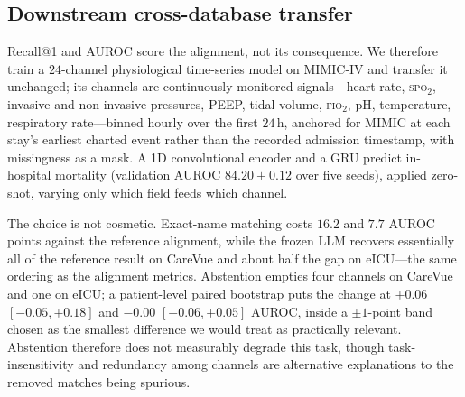 \subsection{Downstream cross-database transfer}
\label{sec:transfer}



Recall@1 and AUROC score the alignment, not its consequence. We therefore train a
$24$-channel physiological time-series model on MIMIC-IV and transfer it unchanged; its
channels are continuously monitored signals---heart rate, \textsc{spo}$_2$, invasive and
non-invasive pressures, PEEP, tidal volume, \textsc{fio}$_2$, pH, temperature,
respiratory rate---binned hourly over the first $24$\,h, anchored for MIMIC at each stay's
earliest charted event rather than the recorded admission timestamp, with missingness as
a mask. A 1D convolutional encoder and a GRU predict in-hospital mortality (validation
AUROC $84.20\pm0.12$ over five seeds), applied zero-shot, varying only which field feeds
which channel.

The choice is not cosmetic. Exact-name matching costs $16.2$ and $7.7$ AUROC points
against the reference alignment, while the frozen LLM recovers essentially all of the
reference result on CareVue and about half the gap on eICU---the same ordering as the
alignment metrics. Abstention empties four channels on CareVue and one on eICU; a
patient-level paired bootstrap puts the change at $+0.06$ $[-0.05,+0.18]$ and $-0.00$
$[-0.06,+0.05]$ AUROC, inside a $\pm1$-point band chosen as the smallest difference we
would treat as practically relevant. Abstention therefore does not measurably degrade this
task, though task-insensitivity and redundancy among channels are alternative explanations
to the removed matches being spurious.
